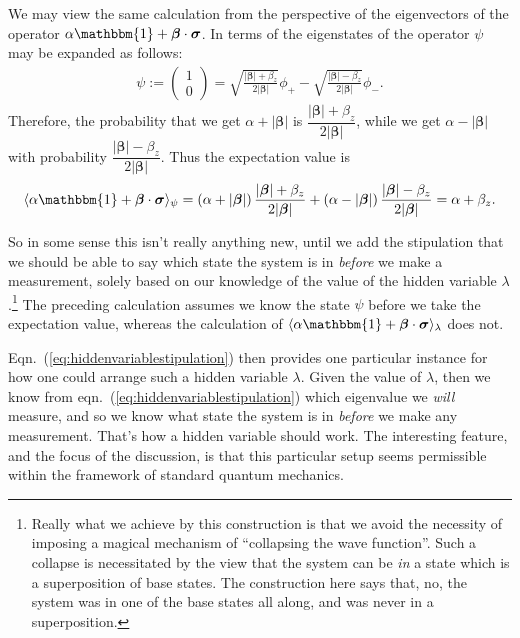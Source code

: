 \documentclass[12pt]{article}
\begin{document}
We may view the same calculation from the perspective of the
eigenvectors of the operator $\alpha \mathbbm{1}
+\bm{\beta}\cdot\bm{\sigma}$. In terms of the eigenstates of the operator
$\psi$ may be expanded as follows:
\begin{align*}
  \psi
  :=
  \begin{pmatrix}
    1\\
    0
  \end{pmatrix}
  = \sqrt{\frac{|\bm{\beta}|+\beta_z}{2|\bm{\beta}|}}\phi_{+} - \sqrt{\frac{|\bm{\beta}|-\beta_z}{2|\bm{\beta}|}}\phi_{-}.
\end{align*}
Therefore, the probability that we get $\alpha+|\bm{\beta}|$ is $\dfrac{|\bm{\beta}|+\beta_z}{2|\bm{\beta}|}$, while we get $\alpha-|\bm{\beta}|$ with probability $\dfrac{|\bm{\beta}|-\beta_z}{2|\bm{\beta}|}$.
Thus the expectation value is
\begin{align*}
  \langle \alpha \mathbbm{1} + \bm{\beta} \cdot \bm{\sigma} \rangle_{\psi}
  = \left( \alpha+|\bm{\beta}| \right) \dfrac{|\bm{\beta}|+\beta_z}{2|\bm{\beta}|} + \left( \alpha-|\bm{\beta}| \right) \dfrac{|\bm{\beta}|-\beta_z}{2|\bm{\beta}|}
  = \alpha + \beta_z.
\end{align*}

So in some sense this isn't really anything new, until we add the stipulation that we should be able to say which state the system is in \emph{before} we make a measurement, solely based on our knowledge of the value of the hidden variable $\lambda$.\footnote{Really what we achieve by this construction is that we avoid the necessity of imposing a magical mechanism of ``collapsing the wave function''. Such a collapse is necessitated by the view that the system can be \emph{in} a state which is a superposition of base states. The construction here says that, no, the system was in one of the base states all along, and was never in a superposition.} The preceding calculation assumes we know the state $\psi$ before we take the expectation value, whereas the calculation of $\langle \alpha \mathbbm{1} + \bm{\beta} \cdot \bm{\sigma} \rangle_{\lambda}$ does not.

Eqn.~(\ref{eq:hiddenvariablestipulation}) then provides one particular instance for how one could arrange such a hidden variable $\lambda$. Given the value of $\lambda$, then we know from eqn.~(\ref{eq:hiddenvariablestipulation}) which eigenvalue we \emph{will} measure, and so we know what state the system is in \emph{before} we make any measurement. That's how a hidden variable should work. The interesting feature, and the focus of the discussion, is that this particular setup seems permissible within the framework of standard quantum mechanics.
\end{document}
